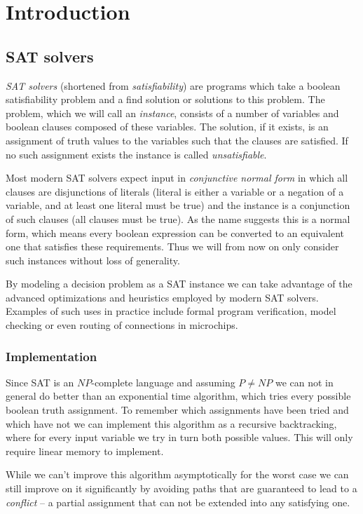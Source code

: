 \chapter{Introduction}
\section{SAT solvers}
\emph{SAT solvers} (shortened from \emph{satisfiability}) are programs which take a boolean satisfiability problem and a find solution or solutions to this problem.
The problem, which we will call an \emph{instance}, consists of a number of variables and boolean clauses composed of these variables.
The solution, if it exists, is an assignment of truth values to the variables such that the clauses are satisfied.
If no such assignment exists the instance is called \emph{unsatisfiable}.

Most modern SAT solvers expect input in \emph{conjunctive normal form} in which all clauses are disjunctions of literals (literal is either a variable or a negation of a variable, and at least one literal must be true) and the instance is a conjunction of such clauses (all clauses must be true).
As the name suggests this is a normal form, which means every boolean expression can be converted to an equivalent one that satisfies these requirements.
Thus we will from now on only consider such instances without loss of generality.

By modeling a decision problem as a SAT instance we can take advantage of the advanced optimizations and heuristics employed by modern SAT solvers.
Examples of such uses in practice include formal program verification, model checking or even routing of connections in microchips.

\subsection{Implementation}
Since SAT is an $NP$-complete language and assuming $P \neq NP$ we can not in general do better than an exponential time algorithm, which tries every possible boolean truth assignment.
To remember which assignments have been tried and which have not we can implement this algorithm as a recursive backtracking, where for every input variable we try in turn both possible values.
This will only require linear memory to implement.

While we can't improve this algorithm asymptotically for the worst case we can still improve on it significantly by avoiding paths that are guaranteed to lead to a \emph{conflict} -- a partial assignment that can not be extended into any satisfying one.

